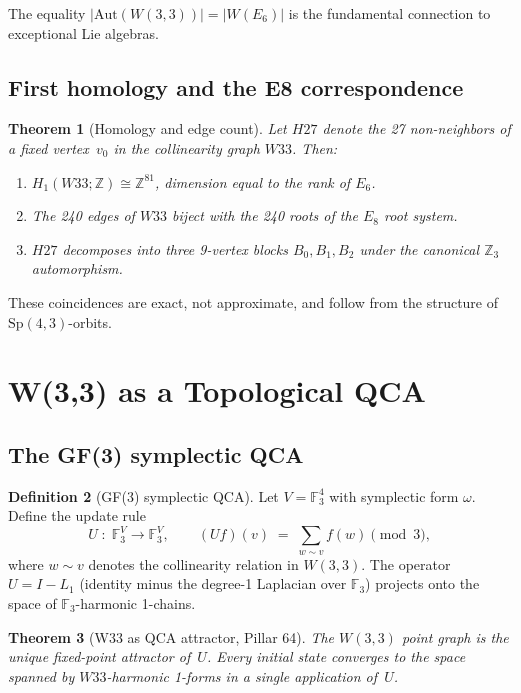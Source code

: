 \documentclass[11pt,a4paper]{article}
\newtheorem{theorem}{Theorem}[section]
\theoremstyle{definition}
\newtheorem{definition}[theorem]{Definition}
\theoremstyle{remark}
\newcommand{\GF}[1]{\mathbb{F}_{#1}}
\newcommand{\ZZ}{\mathbb{Z}}
\newcommand{\Aut}{\mathrm{Aut}}
\newcommand{\Sp}{\mathrm{Sp}}
\begin{document}
The equality $|\Aut(W(3{,}3))| = |W(E_6)|$ is the fundamental connection to
exceptional Lie algebras.

\subsection{First homology and the E8 correspondence}

\begin{theorem}[Homology and edge count]\label{thm:homology}
Let $H27$ denote the 27 non-neighbors of a fixed vertex~$v_0$ in the
collinearity graph $W33$.  Then:
\begin{enumerate}[label=(\roman*),nosep]
  \item $H_1(W33;\ZZ) \cong \ZZ^{81}$, dimension equal to the rank of $E_6$.
  \item The 240 edges of $W33$ biject with the 240 roots of the $E_8$ root system.
  \item $H27$ decomposes into three 9-vertex blocks $B_0, B_1, B_2$ under the
    canonical $\ZZ_3$ automorphism.
\end{enumerate}
\end{theorem}

These coincidences are exact, not approximate, and follow from the structure of
$\Sp(4,3)$-orbits.

\section{W(3,3) as a Topological QCA}\label{sec:qca}

\subsection{The GF(3) symplectic QCA}

\begin{definition}[GF(3) symplectic QCA]
Let $V = \GF{3}^4$ with symplectic form $\omega$.  Define the update rule
\[
    U \;:\; \GF{3}^V \to \GF{3}^V,
    \qquad
    (Uf)(v) \;=\; \sum_{w \sim v} f(w) \pmod{3},
\]
where $w \sim v$ denotes the collinearity relation in $W(3{,}3)$.
The operator $U = I - L_1$ (identity minus the degree-1 Laplacian over $\GF{3}$)
projects onto the space of $\GF{3}$-harmonic 1-chains.
\end{definition}

\begin{theorem}[W33 as QCA attractor, Pillar 64]\label{thm:qca_attractor}
The $W(3{,}3)$ point graph is the unique fixed-point attractor of~$U$.
Every initial state converges to the space spanned by $W33$-harmonic 1-forms
in a single application of~$U$.
\end{theorem}
\end{document}
